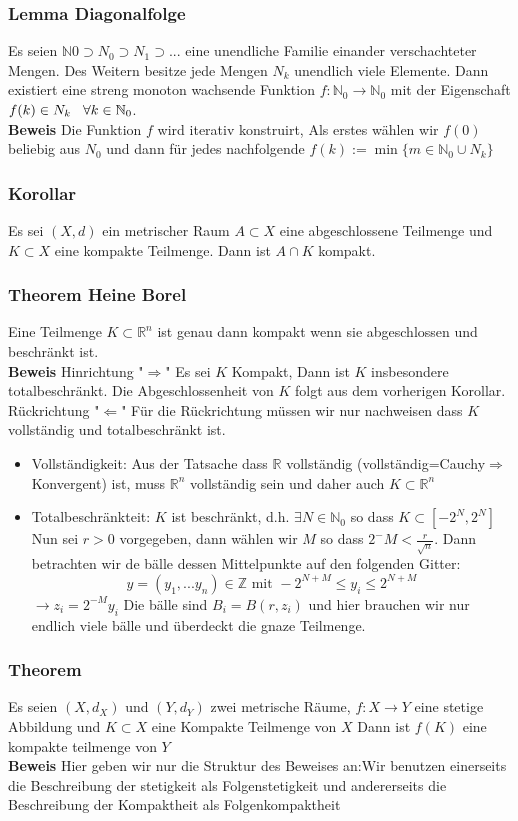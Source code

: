 \documentclass{article}
\newcommand{\smspc}{\hspace{0.3cm}}
\newcommand{\korollar}[1]{\subsubsection*{Korollar {#1}}}
\newcommand{\beweis}{\\\textbf{Beweis }}
\newcommand{\theorem}[1]{\subsubsection*{Theorem {#1}}}
\newcommand{\lemma}[1]{\subsubsection*{Lemma {#1}}}
\begin{document}
\lemma{Diagonalfolge} Es seien $\mathbb{N}0\supset N_0\supset N_1\supset ...$ eine unendliche Familie einander verschachteter Mengen. Des Weitern besitze jede Mengen $N_k$ unendlich viele Elemente.
Dann existiert eine streng monoton wachsende Funktion $f:\mathbb{N}_0\rightarrow \mathbb{N}_0$ mit der Eigenschaft $f(k)\in N_k \smspc \forall k\in\mathbb{N}_0$.
\beweis Die Funktion $f$ wird iterativ konstruirt, Als erstes wählen wir $f(0)$ beliebig aus $N_0$ und dann für jedes nachfolgende $f(k):=\min\lbrace m\in\mathbb{N}_0\cup N_k\rbrace$
\korollar{} Es sei $(X,d)$ ein metrischer Raum $A\subset X$ eine abgeschlossene Teilmenge und $K\subset X$ eine kompakte Teilmenge. Dann ist $A\cap K$ kompakt.
\noindent\subsubsection*{Theorem Heine Borel} Eine Teilmenge $K\subset \mathbb{R}^n$ ist genau dann kompakt wenn sie abgeschlossen und beschränkt ist.
\beweis  \newline Hinrichtung "$\Rightarrow$" Es sei $K$ Kompakt, Dann ist $K$ insbesondere totalbeschränkt. Die Abgeschlossenheit von $K$ folgt aus dem vorherigen Korollar.
\newline Rückrichtung "$\Leftarrow$" Für die Rückrichtung müssen wir nur nachweisen dass $K$ vollständig und totalbeschränkt ist.
\begin{itemize}
  \item[]{Vollständigkeit:  Aus der Tatsache dass $\mathbb{R}$ vollständig (vollständig=Cauchy$\Rightarrow$Konvergent) ist, muss $\mathbb{R}^n$ vollständig sein und daher auch $K\subset \mathbb{R}^n$}
  \item[]{Totalbeschränkteit:   $K$ ist beschränkt, d.h. $\exists N\in\mathbb{N}_0$ so dass $K\subset[-2^N,2^N]$ Nun sei $r>0$ vorgegeben, dann wählen wir $M$ so dass $2^-M<\frac{r}{\sqrt{n}}$. Dann betrachten wir de bälle dessen Mittelpunkte auf den folgenden Gitter:\[y=(y_1,...y_n)\in\mathbb{Z}\text{ mit } -2^{N+M}\le y_i\le2^{N+M}\]$\rightarrow z_i=2^{-M}y_i$ Die bälle sind $B_i=B(r,z_i)$ und hier brauchen wir nur endlich viele bälle und überdeckt die gnaze Teilmenge. }\end{itemize}
\noindent
\theorem{} Es seien $(X,d_X)$ und $(Y,d_Y)$ zwei metrische Räume, $f:X\rightarrow Y$ eine stetige Abbildung und $K\subset X$ eine Kompakte Teilmenge von $X$ Dann ist $f(K)$ eine kompakte teilmenge von $Y$
\beweis Hier geben wir nur die Struktur des Beweises an:\newline Wir benutzen einerseits die Beschreibung der stetigkeit als Folgenstetigkeit und andererseits die Beschreibung der Kompaktheit als Folgenkompaktheit\newline 
\end{document}
